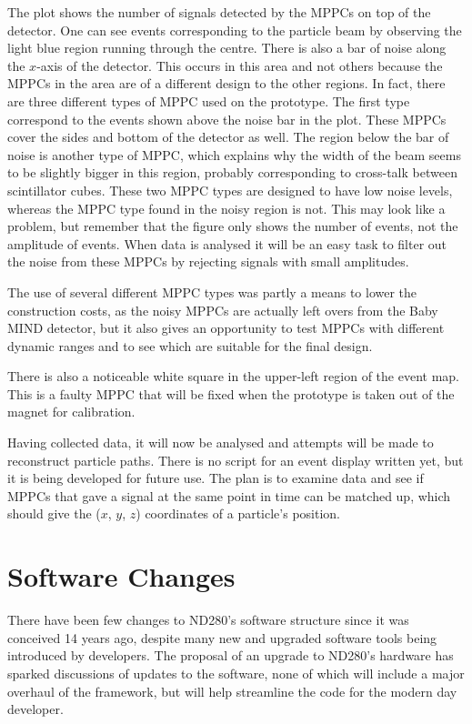 \documentclass[aps,pra,12pt,notitlepage,tightenlines]{revtex4-1}
\begin{document}
The plot shows the number of signals detected by the MPPCs on top of the detector. One can see events corresponding to the particle beam by observing the light blue region running through the centre. There is also a bar of noise along the $x$-axis of the detector. This occurs in this area and not others because the MPPCs in the area are of a different design to the other regions. In fact, there are three different types of MPPC used on the prototype. The first type correspond to the events shown above the noise bar in the plot. These MPPCs cover the sides and bottom of the detector as well. The region below the bar of noise is another type of MPPC, which explains why the width of the beam seems to be slightly bigger in this region, probably corresponding to cross-talk between scintillator cubes. These two MPPC types are designed to have low noise levels, whereas the MPPC type found in the noisy region is not. This may look like a problem, but remember that the figure only shows the number of events, not the amplitude of events. When data is analysed it will be an easy task to filter out the noise from these MPPCs by rejecting signals with small amplitudes. 

The use of several different MPPC types was partly a means to lower the construction costs, as the noisy MPPCs are actually left overs from the Baby MIND detector, but it also gives an opportunity to test MPPCs with different dynamic ranges and to see which are suitable for the final design.

There is also a noticeable white square in the upper-left region of the event map. This is a faulty MPPC that will be fixed when the prototype is taken out of the magnet for calibration.

Having collected data, it will now be analysed and attempts will be made to reconstruct particle paths. There is no script for an event display written yet, but it is being developed for future use. The plan is to examine data and see if MPPCs that gave a signal at the same point in time can be matched up, which should give the ($x$, $y$, $z$) coordinates of a particle's position.

\section{Software Changes}
There have been few changes to ND280's software structure since it was conceived 14 years ago, despite many new and upgraded software tools being introduced by developers. The proposal of an upgrade to ND280's hardware has sparked discussions of updates to the software, none of which will include a major overhaul of the framework, but will help streamline the code for the modern day developer. 
\end{document}
